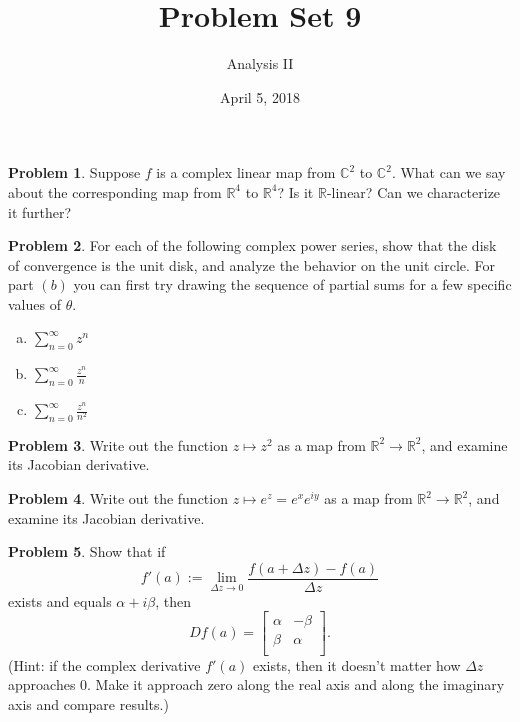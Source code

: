 \documentclass{amsart}
\newcommand{\+}[1]{\ensuremath{\mathbf{#1}}}
\newcommand{\C}{{\mathbb C}}
\newcommand{\R}{{\mathbb R}}
\theoremstyle{definition}
\newtheorem{prob}{Problem}
\begin{document}
\title{Problem Set 9}
\date{April 5, 2018}
\author{Analysis II}

\maketitle

\begin{prob}
 Suppose $f$ is a complex linear map from $\C^2$ to $\C^2$.
 What can we say about the corresponding map from $\R^{4}$ to $\R^{4}$?
 Is it $\R$-linear?  Can we characterize it further?
\end{prob}

\begin{prob}
For each of the following complex power series, show that the disk of convergence is the unit disk, and analyze
the behavior on the unit circle.  For part $(b)$ you can first try drawing the sequence of partial sums for a few specific values of $\theta$.
\begin{enumerate}[(a)]
 \item $\sum^{\infty}_{n = 0} z^n$
 \vspace{2mm}
 \item $\sum^{\infty}_{n = 0} \frac{z^n}{n}$
 \vspace{2mm}
 \item $\sum^{\infty}_{n = 0} \frac{z^n}{n^2}$
\end{enumerate}
\end{prob}

\begin{prob}
 Write out the function $z \mapsto z^2$ as a map from $\R^2 \to \R^2$, and
 examine its Jacobian derivative.
\end{prob}

\begin{prob}
 Write out the function $z \mapsto e^z = e^x e^{iy}$ as a map from $\R^2 \to \R^2$, and
 examine its Jacobian derivative.
\end{prob}

\begin{prob}
 Show that if \[f'(a) := \lim_{\Delta z \to 0} \frac{f(a + \Delta z) - f(a)}{\Delta z}\] exists and equals $\alpha + i \beta$, then
 \[
 Df(a) = 
  \begin{bmatrix}
\alpha & -\beta \\ \beta & \alpha \\
\end{bmatrix}.
 \]
 (Hint: if the complex derivative $f'(a)$ exists, then it doesn't matter how $\Delta z$ approaches $0$.
 Make it approach zero along the real axis and along the imaginary axis and compare results.)
\end{prob}
\end{document}
